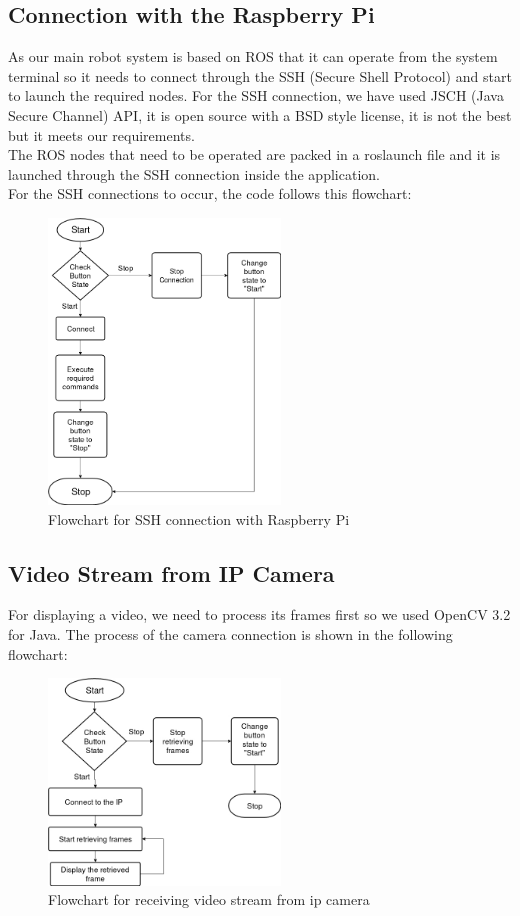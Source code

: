 \documentclass[12pt]{article}
\begin{document}
\subsection{Connection with the Raspberry Pi}
As our main robot system is based on ROS that it can operate from the system terminal so it needs to connect through the SSH (Secure Shell Protocol) and start to launch the required nodes. For the SSH connection, we have used JSCH (Java Secure Channel) API, it is open source with a BSD style license, it is not the best but it meets our requirements.\\
The ROS nodes that need to be operated are packed in a roslaunch file and it is launched through the SSH connection inside the application.\\
For the SSH connections to occur, the code follows this flowchart:

\begin{figure}[H]
	\centering
	\includegraphics[width =0.55\textwidth]{Fig/connection-flowchart.jpg}
	\caption{Flowchart for SSH connection with Raspberry Pi}
	\label{fig:connection-flowchart}
\end{figure}


\subsection{Video Stream from IP Camera}
For displaying a video, we need to process its frames first so we used OpenCV 3.2 for Java. The process of the camera connection is shown in the following flowchart:
\begin{figure}[H]
	\centering
	\includegraphics[width =0.55\textwidth]{Fig/camera-flowchart.jpg}
	\caption{Flowchart for receiving video stream from ip camera}
	\label{fig:camera-flowchart}
\end{figure}
\end{document}
